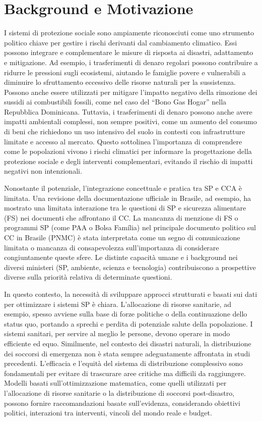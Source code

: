 \documentclass[letterpaper]{article}
\begin{document}
\section{Background e Motivazione}
I sistemi di protezione sociale sono ampiamente riconosciuti come uno strumento politico chiave per gestire i rischi derivanti dal cambiamento climatico. Essi possono integrare e complementare le misure di risposta ai disastri, adattamento e mitigazione. Ad esempio, i trasferimenti di denaro regolari possono contribuire a ridurre le pressioni sugli ecosistemi, aiutando le famiglie povere e vulnerabili a diminuire lo sfruttamento eccessivo delle risorse naturali per la sussistenza. Possono anche essere utilizzati per mitigare l'impatto negativo della rimozione dei sussidi ai combustibili fossili, come nel caso del ``Bono Gas Hogar'' nella Repubblica Dominicana. Tuttavia, i trasferimenti di denaro possono anche avere impatti ambientali complessi, non sempre positivi, come un aumento del consumo di beni che richiedono un uso intensivo del suolo in contesti con infrastrutture limitate e accesso al mercato. Questo sottolinea l'importanza di comprendere come le popolazioni vivono i rischi climatici per informare la progettazione della protezione sociale e degli interventi complementari, evitando il rischio di impatti negativi non intenzionali.

Nonostante il potenziale, l'integrazione concettuale e pratica tra SP e CCA è limitata. Una revisione della documentazione ufficiale in Brasile, ad esempio, ha mostrato una limitata interazione tra le questioni di SP e sicurezza alimentare (FS) nei documenti che affrontano il CC. La mancanza di menzione di FS o programmi SP (come PAA o Bolsa Família) nel principale documento politico sul CC in Brasile (PNMC) è stata interpretata come un segno di comunicazione limitata o mancanza di consapevolezza sull'importanza di considerare congiuntamente queste sfere. Le distinte capacità umane e i background nei diversi ministeri (SP, ambiente, scienza e tecnologia) contribuiscono a prospettive diverse sulla priorità relativa di determinate questioni.

In questo contesto, la necessità di sviluppare approcci strutturati e basati sui dati per ottimizzare i sistemi SP è chiara. L'allocazione di risorse sanitarie, ad esempio, spesso avviene sulla base di forze politiche o della continuazione dello status quo, portando a sprechi e perdita di potenziale salute della popolazione. I sistemi sanitari, per servire al meglio le persone, devono operare in modo efficiente ed equo. Similmente, nel contesto dei disastri naturali, la distribuzione dei soccorsi di emergenza non è stata sempre adeguatamente affrontata in studi precedenti. L'efficacia e l'equità del sistema di distribuzione complessivo sono fondamentali per evitare di trascurare aree critiche ma difficili da raggiungere. Modelli basati sull'ottimizzazione matematica, come quelli utilizzati per l'allocazione di risorse sanitarie o la distribuzione di soccorsi post-disastro, possono fornire raccomandazioni basate sull'evidenza, considerando obiettivi politici, interazioni tra interventi, vincoli del mondo reale e budget.
\end{document}
